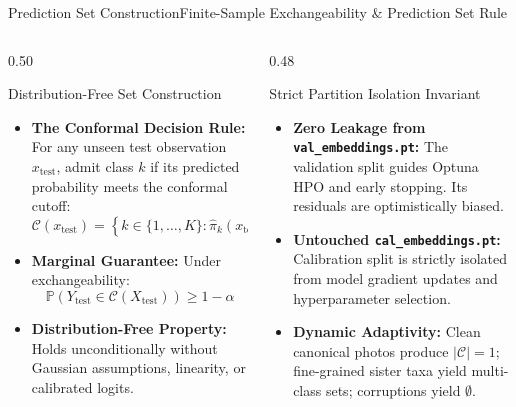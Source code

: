 \begin{frame}{Prediction Set Construction}{Finite-Sample Exchangeability \& Prediction Set Rule}
    \vspace{-0.20cm}
    \begin{columns}[T]
        \begin{column}{0.50\textwidth}
            \begin{block}{Distribution-Free Set Construction}\scriptsize
                \begin{itemize}\setlength{\itemsep}{3pt}
                    \item \textbf{The Conformal Decision Rule:} For any unseen test observation $x_{\text{test}}$, admit class $k$ if its predicted probability meets the conformal cutoff:
                    \[
                        \mathcal{C}(x_{\text{test}}) = \left\{ k \in \{1, \dots, K\} : \hat{\pi}_k(x_{\text{test}}) \ge 1 - \hat{q}_\alpha \right\}
                    \]
                    \item \textbf{Marginal Guarantee:} Under exchangeability:
                    \[
                        \mathbb{P}\left( Y_{\text{test}} \in \mathcal{C}(X_{\text{test}}) \right) \ge 1 - \alpha
                    \]
                    \item \textbf{Distribution-Free Property:} Holds unconditionally without Gaussian assumptions, linearity, or calibrated logits.
                \end{itemize}
            \end{block}
        \end{column}
        \begin{column}{0.48\textwidth}
            \begin{block}{Strict Partition Isolation Invariant}\scriptsize
                \begin{itemize}\setlength{\itemsep}{3pt}
                    \item \textbf{Zero Leakage from \texttt{val\_embeddings.pt}:} The validation split guides Optuna HPO and early stopping. Its residuals are optimistically biased.
                    \item \textbf{Untouched \texttt{cal\_embeddings.pt}:} Calibration split is strictly isolated from model gradient updates and hyperparameter selection.
                    \item \textbf{Dynamic Adaptivity:} Clean canonical photos produce $|\mathcal{C}|=1$; fine-grained sister taxa yield multi-class sets; corruptions yield $\emptyset$.
                \end{itemize}

\end{block}
\end{column}
\end{columns}
\end{frame}
